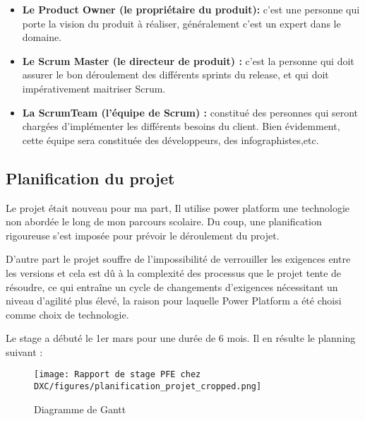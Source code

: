 \begin{itemize}
  \item \textbf{Le Product Owner (le propriétaire du produit):}
        c’est une personne qui porte la vision du produit à réaliser, généralement c’est un expert dans le domaine.
    \\
    \item \textbf{Le Scrum Master (le directeur de produit) :}
        c'est la personne qui doit assurer le bon déroulement des différents sprints du release, et qui doit impérativement maitriser Scrum.
    \\    
    \item \textbf{La ScrumTeam (l’équipe de Scrum) :}
        constitué des personnes qui seront
        chargées d’implémenter les différents besoins du client. Bien
        évidemment, cette équipe sera constituée des développeurs, des
        infographistes,etc.
    \\    

\end{itemize}

\subsection{Planification du projet}
Le projet était nouveau pour ma part, Il utilise power platform une technologie non abordée le long de mon parcours scolaire. Du coup, une planification rigoureuse s’est imposée pour prévoir le déroulement du projet.

D'autre part le projet souffre de l'impossibilité de verrouiller les exigences entre les versions et cela est dû à la complexité des processus que le projet tente de résoudre, ce qui entraîne un cycle de changements d'exigences nécessitant un niveau d'agilité plus élevé, la raison pour laquelle Power Platform a été choisi comme choix de technologie.

Le stage a débuté le 1er mars pour une durée de 6 mois. Il en résulte le planning
suivant :

\begin{figure}[!h]
    \centering
    \texttt{[image: Rapport de stage PFE chez DXC/figures/planification\_projet\_cropped.png]}
    \caption{Diagramme de Gantt}
\end{figure}




